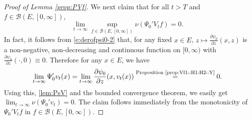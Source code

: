 \documentclass[12pt,a4paper]{amsart}
\numberwithin{equation}{section}
\theoremstyle{plain}
\theoremstyle{definition}
\theoremstyle{remark}
\begin{document}
\begin{proof}[Proof of Lemma \ref{prop:PVf}]
	We next claim that for all $t > T$ and $f\in \mathcal B(E,[0,\infty])$,
\begin{equation}\label{eq:nPPV}
	\lim_{t\to \infty}\sup_{f\in \mathcal B(E, [0,\infty])} \nu(\Psi_0' V_t f) = 0.
\end{equation}
	In fact, it follows from \eqref{e:derofpsi0-2} that, for any fixed $x\in E$, $z\mapsto \frac{\partial \psi_0}{\partial z} (x,z)$ is a non-negative, non-decreasing and continuous function on $[0,\infty)$ with $\frac{\partial \psi_0}{\partial z} (\cdot,0) \equiv 0$.
	Therefore for any $x\in E$, we have
\[
	\lim_{t\to \infty} \Psi_0' v_t(x) =\lim_{t\to \infty} \frac{\partial \psi_0}{ \partial z}(x,v_t(x)) \overset{\text{Proposition \ref{prop:Vf1::H1:H2::Y}}}{=} 0.
\]
	Using this, \eqref{lem:PsV} and the bounded convergence theorem, we easily get $\lim_{t\to \infty}\nu(\Psi_0' v_t)  = 0. $ The claim follows immediately from the monotonicity of $\Psi_0' V_t f$ in $f\in \mathcal B(E,[0,\infty])$.
	

\end{proof}
\end{document}
